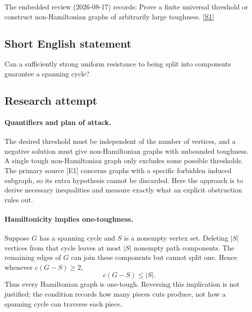 \documentclass[11pt,a4paper]{article}
\newcommand{\sref}[2]{\hyperlink{source:#1:#2}{[S#2]}}
\begin{document}
The embedded review (2026-08-17) records: Prove a finite universal threshold or construct non-Hamiltonian graphs of arbitrarily large toughness. \sref{1415}{1}

\subsection{Short English statement}

Can a sufficiently strong uniform resistance to being split into components guarantee a spanning cycle?

\subsection{Research attempt}

\paragraph{Quantifiers and plan of attack.}
The desired threshold must be independent of the number of vertices,
and a negative solution must give non-Hamiltonian graphs with unbounded
toughness. A single tough non-Hamiltonian graph only excludes some
possible thresholds. The primary source [E1] concerns graphs with a
specific forbidden induced subgraph, so its extra hypothesis cannot be
discarded. Here the approach is to derive necessary inequalities and
measure exactly what an explicit obstruction rules out.

\paragraph{Hamiltonicity implies one-toughness.}
Suppose $G$ has a spanning cycle and $S$ is a nonempty vertex set.
Deleting $|S|$ vertices from that cycle leaves at most $|S|$ nonempty
path components. The remaining edges of $G$ can join these components
but cannot split one. Hence whenever $c(G-S)\ge2$,
\[
                         c(G-S)\le |S|.
\]
Thus every Hamiltonian graph is one-tough. Reversing this implication
is not justified; the condition records how many pieces cuts produce,
not how a spanning cycle can traverse each piece.
\end{document}
